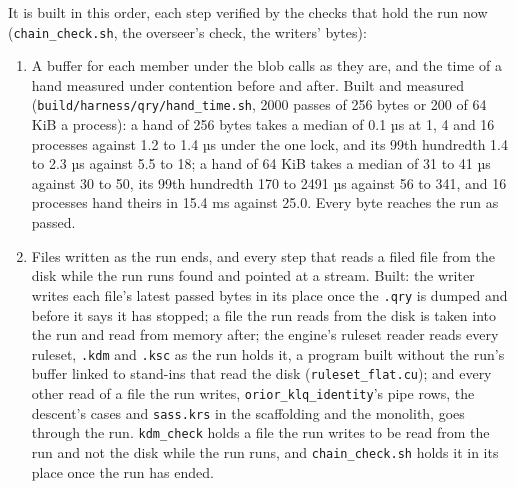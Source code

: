 It is built in this order, each step verified by the checks that hold the run now (\texttt{chain\_\allowbreak{}check.\allowbreak{}sh}, the overseer's check, the writers' bytes):

\begin{enumerate}
\item A buffer for each member under the blob calls as they are, and the time of a hand measured under contention before and after. Built and measured (\texttt{build/\allowbreak{}harness/\allowbreak{}qry/\allowbreak{}hand\_\allowbreak{}time.\allowbreak{}sh}, 2000 passes of 256 bytes or 200 of 64 KiB a process): a hand of 256 bytes takes a median of 0.1 µs at 1, 4 and 16 processes against 1.2 to 1.4 µs under the one lock, and its 99th hundredth 1.4 to 2.3 µs against 5.5 to 18; a hand of 64 KiB takes a median of 31 to 41 µs against 30 to 50, its 99th hundredth 170 to 2491 µs against 56 to 341, and 16 processes hand theirs in 15.4 ms against 25.0. Every byte reaches the run as passed.
\item Files written as the run ends, and every step that reads a filed file from the disk while the run runs found and pointed at a stream. Built: the writer writes each file's latest passed bytes in its place once the \texttt{.\allowbreak{}qry} is dumped and before it says it has stopped; a file the run reads from the disk is taken into the run and read from memory after; the engine's ruleset reader reads every ruleset, \texttt{.\allowbreak{}kdm} and \texttt{.\allowbreak{}ksc} as the run holds it, a program built without the run's buffer linked to stand-ins that read the disk (\texttt{ruleset\_\allowbreak{}flat.\allowbreak{}cu}); and every other read of a file the run writes, \texttt{orior\_\allowbreak{}klq\_\allowbreak{}identity}'s pipe rows, the descent's cases and \texttt{sass.\allowbreak{}krs} in the scaffolding and the monolith, goes through the run. \texttt{kdm\_\allowbreak{}check} holds a file the run writes to be read from the run and not the disk while the run runs, and \texttt{chain\_\allowbreak{}check.\allowbreak{}sh} holds it in its place once the run has ended.

\end{enumerate}
